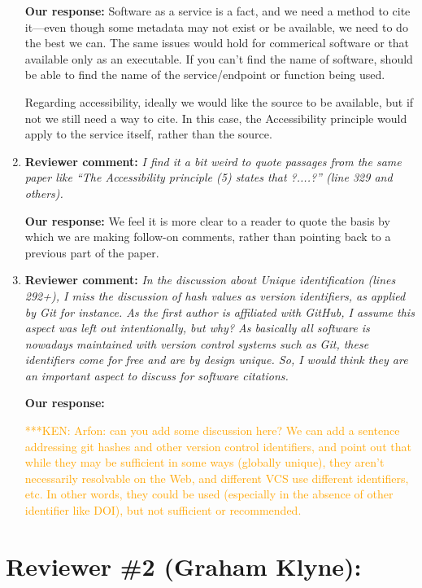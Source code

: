 \documentclass{article}
\newcommand{\niemnote}[1]{ {\textcolor{orange} { ***KEN: #1 }}} %
\begin{document}
\begin{enumerate}
\textbf{Our response:}
Software as a service is a fact, and we need a method to cite it---even though some metadata may not exist or be available, we need to do the best we can.
The same issues would hold for commerical software or that available only as an executable.
If you can't find the name of software, should be able to find the name of the service\slash endpoint or function being used.

Regarding accessibility, ideally we would like the source to be available, but if not we still need a way to cite.
In this case, the Accessibility principle would apply to the service itself, rather than the source.


\item \textbf{Reviewer comment:}
\emph{I find it a bit weird to quote passages from the same paper like ``The Accessibility principle (5) states that ?....?'' (line 329 and others).}

\textbf{Our response:}
We feel it is more clear to a reader to quote the basis by which we are making follow-on comments, rather than pointing back to a previous part of the paper.


\item \textbf{Reviewer comment:}
\emph{In the discussion about Unique identification (lines 292+), I miss the discussion of hash values as version identifiers, as applied by Git for instance. As the first author is affiliated with GitHub, I assume this aspect was left out intentionally, but why? As basically all software is nowadays maintained with version control systems such as Git, these identifiers come for free and are by design unique. So, I would think they are an important aspect to discuss for software citations.}

\textbf{Our response:}

\niemnote{Arfon: can you add some discussion here? We can add a sentence addressing git hashes and other version control identifiers, and point out that while they may be sufficient in some ways (globally unique), they aren't necessarily resolvable on the Web, and different VCS use different identifiers, etc. In other words, they could be used (especially in the absence of other identifier like DOI), but not sufficient or recommended.}

\end{enumerate}

\section*{Reviewer \#2 (Graham Klyne):}
\end{document}
